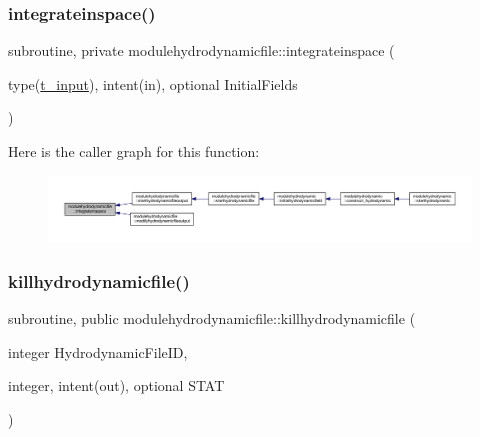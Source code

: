 \subsubsection{\texorpdfstring{integrateinspace()}{integrateinspace()}}
{\footnotesize\ttfamily subroutine, private modulehydrodynamicfile\+::integrateinspace (\begin{DoxyParamCaption}\item[{type(\mbox{\hyperlink{structmodulehydrodynamicfile_1_1t__input}{t\+\_\+input}}), intent(in), optional}]{Initial\+Fields }\end{DoxyParamCaption})\hspace{0.3cm}{\ttfamily [private]}}

Here is the caller graph for this function\+:\nopagebreak
\begin{figure}[H]
\begin{center}
\leavevmode
\includegraphics[width=350pt]{namespacemodulehydrodynamicfile_a567935da3a6ce143ef24e8bb5f4787ea_icgraph}
\end{center}
\end{figure}
\mbox{\label{namespacemodulehydrodynamicfile_a88c5ccf3cef06396cacc97101de6b5ab}} 
\subsubsection{\texorpdfstring{killhydrodynamicfile()}{killhydrodynamicfile()}}
{\footnotesize\ttfamily subroutine, public modulehydrodynamicfile\+::killhydrodynamicfile (\begin{DoxyParamCaption}\item[{integer}]{Hydrodynamic\+File\+ID,  }\item[{integer, intent(out), optional}]{S\+T\+AT }\end{DoxyParamCaption})}

